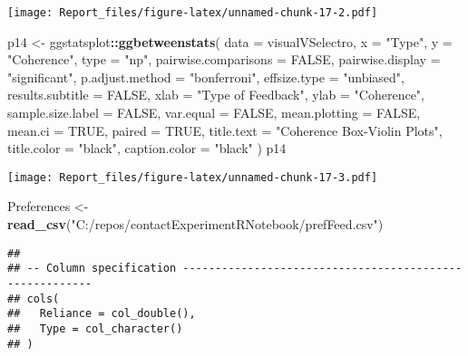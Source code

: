 \documentclass[
]{article}
\newenvironment{Shaded}{\begin{snugshade}}{\end{snugshade}}
\newcommand{\CommentTok}[1]{\textcolor[rgb]{0.56,0.35,0.01}{\textit{#1}}}
\newcommand{\DataTypeTok}[1]{\textcolor[rgb]{0.13,0.29,0.53}{#1}}
\newcommand{\KeywordTok}[1]{\textcolor[rgb]{0.13,0.29,0.53}{\textbf{#1}}}
\newcommand{\NormalTok}[1]{#1}
\newcommand{\OperatorTok}[1]{\textcolor[rgb]{0.81,0.36,0.00}{\textbf{#1}}}
\newcommand{\OtherTok}[1]{\textcolor[rgb]{0.56,0.35,0.01}{#1}}
\newcommand{\StringTok}[1]{\textcolor[rgb]{0.31,0.60,0.02}{#1}}
\begin{document}
\texttt{[image: Report\_files/figure-latex/unnamed-chunk-17-2.pdf]}

\begin{Shaded}
\begin{Highlighting}[]
\NormalTok{p14 <-}\StringTok{ }\NormalTok{ggstatsplot}\OperatorTok{::}\KeywordTok{ggbetweenstats}\NormalTok{(}
  \DataTypeTok{data =}\NormalTok{ visualVSelectro,}
  \DataTypeTok{x =} \StringTok{"Type"}\NormalTok{,}
  \DataTypeTok{y =} \StringTok{"Coherence"}\NormalTok{,}
  \DataTypeTok{type =} \StringTok{"np"}\NormalTok{,}
  \DataTypeTok{pairwise.comparisons =} \OtherTok{FALSE}\NormalTok{,}
  \DataTypeTok{pairwise.display =} \StringTok{"significant"}\NormalTok{,}
  \DataTypeTok{p.adjust.method =} \StringTok{"bonferroni"}\NormalTok{,}
  \DataTypeTok{effsize.type =} \StringTok{"unbiased"}\NormalTok{,}
  \DataTypeTok{results.subtitle =} \OtherTok{FALSE}\NormalTok{,}
  \DataTypeTok{xlab =} \StringTok{"Type of Feedback"}\NormalTok{,}
  \DataTypeTok{ylab =} \StringTok{"Coherence"}\NormalTok{,}
  \DataTypeTok{sample.size.label =} \OtherTok{FALSE}\NormalTok{,}
  \DataTypeTok{var.equal =} \OtherTok{FALSE}\NormalTok{,}
  \DataTypeTok{mean.plotting =} \OtherTok{FALSE}\NormalTok{,}
  \DataTypeTok{mean.ci =} \OtherTok{TRUE}\NormalTok{,}
  \DataTypeTok{paired =} \OtherTok{TRUE}\NormalTok{,}
  \DataTypeTok{title.text =} \StringTok{"Coherence Box-Violin Plots"}\NormalTok{,}
  \DataTypeTok{title.color =} \StringTok{"black"}\NormalTok{,}
  \DataTypeTok{caption.color =} \StringTok{"black"}
\NormalTok{  )}
\NormalTok{p14}
\end{Highlighting}
\end{Shaded}

\texttt{[image: Report\_files/figure-latex/unnamed-chunk-17-3.pdf]}

\begin{Shaded}
\begin{Highlighting}[]
\NormalTok{Preferences <-}\StringTok{ }\KeywordTok{read_csv}\NormalTok{(}\StringTok{"C:/repos/contactExperimentRNotebook/prefFeed.csv"}\NormalTok{)}
\end{Highlighting}
\end{Shaded}

\begin{verbatim}
## 
## -- Column specification --------------------------------------------------------
## cols(
##   Reliance = col_double(),
##   Type = col_character()
## )
\end{verbatim}

\begin{Shaded}
\end{Shaded}
\end{document}
